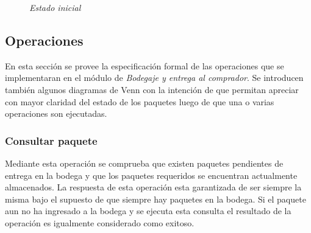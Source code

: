 \documentclass[12pt,a4paper]{article}
\begin{document}
\begin{figure}[H]
\centering
{}
\caption{\textit{Estado inicial}} \label{fig:M1}
\end{figure}

\subsection{Operaciones}

En esta sección se provee la especificación formal de las operaciones que se implementaran en el módulo de \textit{Bodegaje y entrega al comprador}. Se introducen también algunos diagramas de Venn con la intención de que permitan apreciar con mayor claridad del estado de los paquetes luego de que una o varias operaciones son ejecutadas.

\subsubsection{Consultar paquete}

Mediante esta operación se comprueba que existen paquetes pendientes de entrega en la bodega y que los paquetes requeridos se encuentran actualmente almacenados. La respuesta de esta operación esta garantizada de ser siempre la misma bajo el supuesto de que siempre hay paquetes en la bodega. Si el paquete aun no ha ingresado a la bodega y se ejecuta esta consulta el resultado de la operación es igualmente considerado como exitoso.
\end{document}
